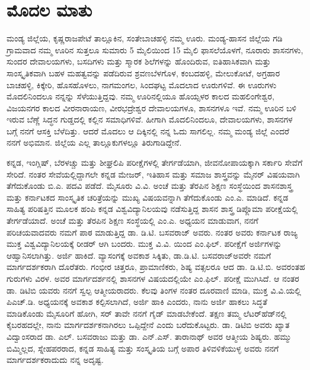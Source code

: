 
\chapter*{ಮೊದಲ ಮಾತು}

ಮಂಡ್ಯ ಜಿಲ್ಲೆಯ, ಕೃಷ್ಣರಾಜಪೇಟೆ ತಾಲ್ಲೂಕಿನ, ಸಂತೇಬಾಚಹಳ್ಳಿ ನಮ್ಮ ಊರು. ಮಂಡ್ಯ-ಹಾಸನ ಜಿಲ್ಲೆಯ ಗಡಿ ಗ್ರಾಮವಾದ ನಮ್ಮ ಊರಿನ ಸುತ್ತಲೂ ಸುಮಾರು 5 ಮೈಲಿಯಿಂದ 15 ಮೈಲಿ ಫಾಸಲೆಯೊಳಗೆ, ನೂರಾರು ಶಾಸನಗಳು, ಸುಂದರ ದೇವಾಲಯಗಳು, ಬಸದಿಗಳು ಮತ್ತು ಸ್ಮಾರಕ ಶಿಲೆಗಳನ್ನು ಹೊಂದಿರುವ, ಐತಿಹಾಸಿಕವಾಗಿ ಮತ್ತು ಸಾಂಸ್ಕೃತಿಕವಾಗಿ ಬಹಳ ಮಹತ್ವವನ್ನು ಪಡೆದಿರುವ ಶ್ರವಣಬೆಳಗೊಳ, ಕಂಬದಹಳ್ಳಿ, ಮೇಲುಕೋಟೆ, ಅಗ್ರಹಾರ ಬಾಚಹಳ್ಳಿ, ಕಿಕ್ಕೇರಿ, ಹೊಸಹೊಳಲು, ನಾಗಮಂಗಲ, ಸಿಂದಘಟ್ಟ ಮೊದಲಾದ ಊರುಗಳಿವೆ. ಈ ಊರುಗಳು ಮೊದಲಿನಿಂದಲೂ ನನ್ನನ್ನು ಸೆಳೆಯುತ್ತಿದ್ದವು. ನಮ್ಮ ಊರಿನಲ್ಲಿಯೂ ಹೊಯ್ಸಳರ ಕಾಲದ ಮಹಲಿಂಗೇಶ್ವರ, ವಿಜಯನಗರ ಕಾಲದ ವೀರನಾರಾಯಣ, ವೀರಭದ್ರೇಶ್ವರ ದೇವಾಲಯಗಳೂ, ಶಾಸನಗಳೂ ಇವೆ. ನಮ್ಮ ಊರಿನ ಬಳಿ ಇರುವ ಬೆಣ್ಣೆ ಸಿದ್ಧನ ಗುಡ್ಡದಲ್ಲಿ ಕಲ್ಲಿನ ಸಮಾಧಿಗಳಿವೆ. ಹೀಗಾಗಿ ಮೊದಲಿನಿಂದಲೂ, ದೇವಾಲಯಗಳು, ಶಾಸನಗಳ ಬಗ್ಗೆ ನನಗೆ ಆಸಕ್ತಿ ಬೆಳೆದಿತ್ತು. ಆದರೆ ಮೊದಲು ಆ ದಿಕ್ಕಿನಲ್ಲಿ ನನ್ನ ಓದು ಸಾಗಲಿಲ್ಲ. ನಮ್ಮ ಮಂಡ್ಯ ಜಿಲ್ಲೆ ಎಂದರೆ ನನಗೆ ಅಭಿಮಾನ. ಜಿಲ್ಲೆಯ ಎಲ್ಲ ತಾಲ್ಲೂಕುಗಳಲ್ಲೂ ತಿರುಗಾಡಿದ್ದೇನೆ.

ಕನ್ನಡ, ಇಂಗ್ಲಿಷ್​, ಬೆರಳಚ್ಚು ಮತ್ತು ಶೀಘ್ರಲಿಪಿ ಪರೀಕ್ಷೆಗಳಲ್ಲಿ ತೇರ್ಗಡೆಯಾಗಿ, ಜೀವನೋಪಾಯಕ್ಕಾಗಿ ಸರ್ಕಾರಿ ಸೇವೆಗೆ ಸೇರಿದೆ. ನಂತರ ಸೇವೆಯಲ್ಲಿದ್ದಾಗಲೇ ಕನ್ನಡ ಮೇಜರ್​, ಇತಿಹಾಸ ಮತ್ತು ಸಮಾಜ ಶಾಸ್ತ್ರವನ್ನು ಮೈನರ್​ ವಿಷಯವಾಗಿ ತೆಗೆದುಕೊಂಡು ಬಿ.ಎ. ಪದವಿ ಪಡೆದೆ. ಮೈಸೂರು ವಿ.ವಿ. ಅಂಚೆ ಮತ್ತು ತೆರಪಿನ ಶಿಕ್ಷಣ ಸಂಸ್ಥೆಯಿಂದ ಶಾಸನಶಾಸ್ತ್ರ ಮತ್ತು ಕರ್ನಾಟಕದ ಸಾಂಸ್ಕೃತಿಕ ಚರಿತ್ರೆಯನ್ನು ಮುಖ್ಯ ವಿಷಯವನ್ನಾಗಿ ತೆಗೆದುಕೊಂಡು ಎಂ.ಎ. ಮಾಡಿದೆ. ಕನ್ನಡ ಸಾಹಿತ್ಯ ಪರಿಷತ್ತಿನ ಮೂಲಕ ಹಂಪಿ ಕನ್ನಡ ವಿಶ್ವವಿದ್ಯಾನಿಲಯವು ನಡೆಸುತ್ತಿದ್ದ ಶಾಸನ ಶಾಸ್ತ್ರ ಡಿಪ್ಲೊಮಾ ಪರೀಕ್ಷೆಯಲ್ಲಿ ತೇರ್ಗಡೆಯಾದೆ. ಅಂಚೆ ಮತ್ತು ತೆರಪಿನ ಶಿಕ್ಷಣ ಸಂಸ್ಥೆಯಲ್ಲಿ ಎಂ.ಎ. ಅಧ್ಯಯನ ಮಾಡುವಾಗ, ನನಗೆ ಪರಿಚಯವಾದವರು ನಮಗೆ ಪಾಠ ಮಾಡುತ್ತಿದ್ದ ಡಾ. ಡಿ.ಟಿ. ಬಸವರಾಜ್​ ಅವರು. ನಂತರ ಅವರು ಕರ್ನಾಟಕ ರಾಜ್ಯ ಮುಕ್ತ ವಿಶ್ವವಿದ್ಯಾನಿಲಯಕ್ಕೆ ರೀಡರ್​ ಆಗಿ ಬಂದರು. ಮುಕ್ತ ವಿ.ವಿ. ಯಿಂದ ಎಂ.ಫಿಲ್​. ಪರೀಕ್ಷೆಗೆ ಅರ್ಜಿಗಳನ್ನು ಆಹ್ವಾನಿಸಲಾಗಿತ್ತು. ಅರ್ಜಿ ಹಾಕಿದೆ. ವ್ಯಾಸಂಗಕ್ಕೆ ಅವಕಾಶ ಸಿಕ್ಕಿತು, ಡಾ.ಡಿ.ಟಿ. ಬಸವರಾಜ್​ ಅವರೇ ನಮಗೆ ಮಾರ್ಗದರ್ಶಕರಾಗಿ ದೊರೆತರು. ಗಂಭೀರ ಚಿತ್ತರೂ, ಪ್ರಾಮಾಣಿಕರು, ಶಿಷ್ಯ ವತ್ಸಲರೂ ಆದ ಡಾ. ಡಿ.ಟಿ.ಬಿ. ಅವರಂತಹ ಗುರುಗಳು ವಿರಳ. ಅವರ ಮಾರ್ಗದರ್ಶನಲ್ಲಿ ಶಾಸನಗಳ ವಿಷಯದಲ್ಲಿಯೇ ಎಂ.ಫಿಲ್​. ಪರೀಕ್ಷೆ ಮುಗಿಸಿದೆ. ಆ ನಂತರ ಡಾ. ಡಿಟಿಬಿ ಯವರು ನನಗೆ ಸ್ವಲ್ಪ ಆತ್ಮೀಯರಾದರು. ಕೆಲವು ತಿಂಗಳ ನಂತರ ದೂರವಾಣಿ ಮಾಡಿ, ಮುಕ್ತ ವಿ.ವಿ.ಯಲ್ಲಿ ಪಿಎಚ್​.ಡಿ. ಅಧ್ಯಯನಕ್ಕೆ ಅವಕಾಶ ಕಲ್ಪಿಸಲಾಗಿದೆ, ಅರ್ಜಿ ಹಾಕಿ ಎಂದರು, ನಾನು ಅರ್ಜಿ ಹಾಕಲು ಸಿದ್ಧತೆ ಮಾಡಿಕೊಂಡು ಮೈಸೂರಿಗೆ ಹೋಗಿ, ಸರ್​ ತಾವೇ ನನಗೆ ಗೈಡ್​ ಮಾಡಬೇಕೆಂದೆ. ತಕ್ಷಣ ತಮ್ಮ ಲೆಟರ್​ಹೆಡ್​ನಲ್ಲಿ ಕೈಬರಹ\-ದಲ್ಲೇ, ನಾನು ಮಾರ್ಗದರ್ಶಕನಾಗಿರಲು ಒಪ್ಪಿದ್ದೇನೆ ಎಂದು ಬರೆದುಕೊಟ್ಟರು. ಡಾ. ಡಿಟಿಬಿ ಅವರು ಖ್ಯಾತ ವಿದ್ವಾಂಸರಾದ ಡಾ. ಎಲ್​. ಬಸವರಾಜು ಮತ್ತು ಡಾ. ಎನ್​.ಎಸ್​. ತಾರಾನಾಥ್​ ಅವರ ಆತ್ಮೀಯ ಶಿಷ್ಯರು. ಹಮ್ಮು ಬಿಮ್ಮಿಲ್ಲದ, ಸ್ನೇಹಪರರಾದ, ಕನ್ನಡ ಸಾಹಿತ್ಯ ಮತ್ತು ಸಂಸ್ಕೃತಿಯ ಬಗ್ಗೆ ಅಪಾರ ತಿಳಿವಳಿಕೆಯುಳ್ಳ ಅವರು ನನಗೆ ಮಾರ್ಗದರ್ಶಕರಾದುದು ನನ್ನ ಅದೃಷ್ಟ.

